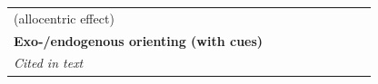 \documentclass[11pt,english,]{memoir}
\begin{document}
\begin{longtable}[]{@{}lllllllll@{}}
\begin{minipage}[t]{0.24\columnwidth}
(allocentric effect)\strut
\end{minipage}\tabularnewline
\begin{minipage}[t]{0.12\columnwidth}\raggedright
\textbf{Exo-/endogenous orienting
(with cues)}\strut
\end{minipage} & \begin{minipage}[t]{0.02\columnwidth}\raggedright
\strut
\end{minipage} & \begin{minipage}[t]{0.04\columnwidth}\raggedright
\strut
\end{minipage} & \begin{minipage}[t]{0.11\columnwidth}\raggedright
\strut
\end{minipage} & \begin{minipage}[t]{0.03\columnwidth}\raggedright
\strut
\end{minipage} & \begin{minipage}[t]{0.05\columnwidth}\raggedright
\strut
\end{minipage} & \begin{minipage}[t]{0.05\columnwidth}\raggedright
\strut
\end{minipage} & \begin{minipage}[t]{0.11\columnwidth}\raggedright
\strut
\end{minipage} & \begin{minipage}[t]{0.24\columnwidth}\raggedright
\strut
\end{minipage}\tabularnewline
\begin{minipage}[t]{0.12\columnwidth}\raggedright
\emph{Cited in text}\strut
\end{minipage} & \begin{minipage}[t]{0.02\columnwidth}\raggedright
\strut
\end{minipage} & \begin{minipage}[t]{0.04\columnwidth}\raggedright
\strut
\end{minipage} & \begin{minipage}[t]{0.11\columnwidth}\raggedright
\strut
\end{minipage} & \begin{minipage}[t]{0.03\columnwidth}\raggedright
\strut
\end{minipage} & \begin{minipage}[t]{0.05\columnwidth}\raggedright
\strut
\end{minipage} & \begin{minipage}[t]{0.05\columnwidth}\raggedright
\strut
\end{minipage} & \begin{minipage}[t]{0.11\columnwidth}\raggedright

\end{minipage}
\end{longtable}
\end{document}

